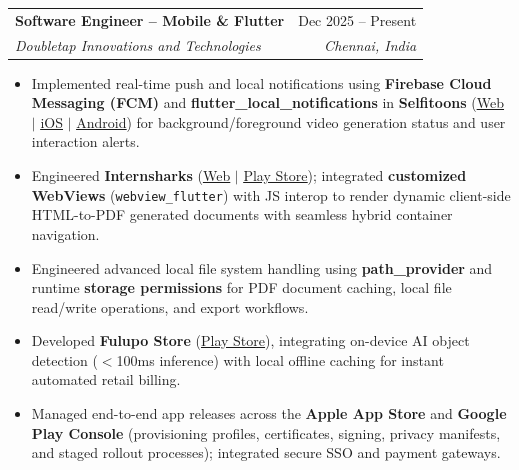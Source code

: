 \documentclass[letterpaper,10pt]{article}
\makeatletter
\newcommand{\resumeItem}[1]{
  \item\small{
    {#1 \vspace{-2pt}}
  }
}
\newcommand{\resumeSubheading}[4]{
  \vspace{-2pt}\item
    \begin{tabular*}{0.97\textwidth}[t]{l@{\extracolsep{\fill}}r}
      \textbf{#1} & #2 \\
      \textit{\small#3} & \textit{\small #4} \\
    \end{tabular*}\vspace{-6pt}
}
\newcommand{\resumeItemListStart}{\begin{itemize}}
\newcommand{\resumeItemListEnd}{\end{itemize}\vspace{-5pt}}
\makeatother
\begin{document}
    \resumeSubheading
      {Software Engineer -- Mobile \& Flutter}{Dec 2025 -- Present}
      {Doubletap Innovations and Technologies}{Chennai, India}
      \resumeItemListStart
        \resumeItem{Implemented real-time push and local notifications using \textbf{Firebase Cloud Messaging (FCM)} and \textbf{flutter\_local\_notifications} in \textbf{Selfitoons} (\href{https://selfitoons.ai/}{\underline{Web}} $|$ \href{https://apps.apple.com/in/app/selfitoons/id6758597947}{\underline{iOS}} $|$ \href{https://play.google.com/store/apps/details?id=com.doubletap.ai.selfitoons}{\underline{Android}}) for background/foreground video generation status and user interaction alerts.}
        \resumeItem{Engineered \textbf{Internsharks} (\href{https://internsharks.ai/}{\underline{Web}} $|$ \href{https://play.google.com/store/apps/details?id=com.doubletap.internsharks.ai}{\underline{Play Store}}); integrated \textbf{customized WebViews} (\texttt{webview\_flutter}) with JS interop to render dynamic client-side HTML-to-PDF generated documents with seamless hybrid container navigation.}
        \resumeItem{Engineered advanced local file system handling using \textbf{path\_provider} and runtime \textbf{storage permissions} for PDF document caching, local file read/write operations, and export workflows.}
        \resumeItem{Developed \textbf{Fulupo Store} (\href{https://play.google.com/store/apps/details?id=com.doubletap.fulupostore}{\underline{Play Store}}), integrating on-device AI object detection ($<$100ms inference) with local offline caching for instant automated retail billing.}
        \resumeItem{Managed end-to-end app releases across the \textbf{Apple App Store} and \textbf{Google Play Console} (provisioning profiles, certificates, signing, privacy manifests, and staged rollout processes); integrated secure SSO and payment gateways.}
      \resumeItemListEnd
\end{document}
